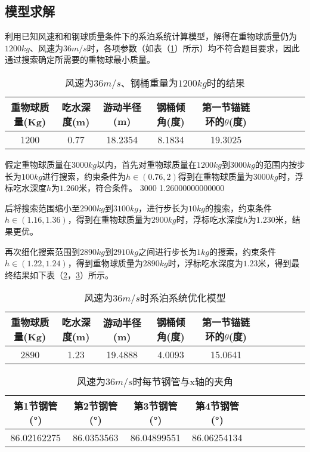 \documentclass[withoutpreface,bwprint]{cumcmthesis} %
\begin{document}
\subsection{模型求解}
\par 利用已知风速和和钢球质量条件下的系泊系统计算模型，解得在重物球质量仍为$1200kg$、风速为$36m/s$时，各项参数（如表（\ref{q2-ans-table0}）所示）均不符合题目要求，因此通过搜索确定所需要的重物球最小质量。
\begin{table}[!htbp]
\centering
\caption{风速为$36m/s$、钢桶重量为$1200kg$时的结果}
\label{q2-ans-table0}
\begin{tabular}{cccccccccc}
\toprule
重物球质量(Kg)& 吃水深度(m)& 游动半径(m)& 钢桶倾角(度)& 第一节锚链环的$\theta$(度) \\
\midrule
1200 & 0.77 & 18.2354 & 8.1834 & 19.3025\\
\bottomrule 
\end{tabular}
\end{table}

\par 假定重物球质量在$3000kg$以内，首先对重物球质量在$1200kg$到$3000kg$的范围内按步长为$100kg$进行搜索，约束条件为$h \in (0.76,2)$得到在重物球质量为$3000kg$时，浮标吃水深度$h$为$1.260$米，符合条件。
3000	1.26000000000000	
\par 后将搜索范围缩小至$2900kg$到$3100kg$，进行步长为$10kg$的搜索，约束条件$h \in (1.16,1.36)$，得到在重物球质量为$2900kg$时，浮标吃水深度$h$为$1.230$米，结果更优。

\par 再次细化搜索范围到$2890kg$到$2910kg$之间进行步长为$1kg$的搜索，约束条件$h \in (1.22,1.24)$，得到重物球质量为$2890kg$时，浮标吃水深度为$1.23$米，得到最终结果如下表（\ref{q2-ans-table}，\ref{q2-ans-table2}）所示。

\begin{table}[!htbp]
\centering
\caption{风速为$36m/s$时系泊系统优化模型}
\label{q2-ans-table}
\begin{tabular}{cccccccccc}
\toprule
重物球质量(Kg)& 吃水深度(m)& 游动半径(m)& 钢桶倾角(度)& 第一节锚链环的$\theta$(度) \\
\midrule
2890 & 1.23 & 19.4888 & 4.0093 & 15.0641\\
\bottomrule 
\end{tabular}
\end{table}

\begin{table}[!htbp]
\centering
\caption{风速为$36m/s$时每节钢管与x轴的夹角}
\label{q2-ans-table2}
\begin{tabular}{cccccccccc}
\toprule
第1节钢管(°)& 第2节钢管(°)& 第3节钢管(°)& 第4节钢管(°) \\
\midrule
86.02162275	&86.0353563	&86.04899551	&86.06254134\\
\bottomrule 
\end{tabular}
\end{table}
\end{document}
